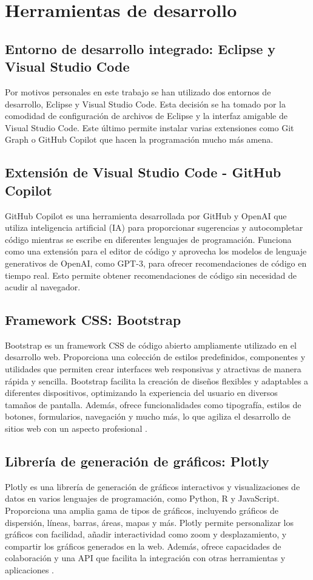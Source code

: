 \section{Herramientas de desarrollo}
\subsection{Entorno de desarrollo integrado: Eclipse y Visual Studio Code}
Por motivos personales en este trabajo se han utilizado dos entornos de desarrollo, Eclipse y Visual Studio Code. Esta decisión se ha tomado por la comodidad de configuración de archivos de Eclipse y la interfaz amigable de Visual Studio Code. Este último permite instalar varias extensiones como Git Graph o GitHub Copilot que hacen la programación mucho más amena.
\subsection{Extensión de Visual Studio Code - GitHub Copilot}
GitHub Copilot es una herramienta desarrollada por GitHub y OpenAI que utiliza inteligencia artificial (IA) para proporcionar sugerencias y autocompletar código mientras se escribe en diferentes lenguajes de programación. Funciona como una extensión para el editor de código y aprovecha los modelos de lenguaje generativos de OpenAI, como GPT-3, para ofrecer recomendaciones de código en tiempo real.
Esto permite obtener recomendaciones de código sin necesidad de acudir al navegador.
\subsection{Framework CSS: Bootstrap}
Bootstrap es un framework CSS de código abierto ampliamente utilizado en el desarrollo web. Proporciona una colección de estilos predefinidos, componentes y utilidades que permiten crear interfaces web responsivas y atractivas de manera rápida y sencilla. Bootstrap facilita la creación de diseños flexibles y adaptables a diferentes dispositivos, optimizando la experiencia del usuario en diversos tamaños de pantalla. Además, ofrece funcionalidades como tipografía, estilos de botones, formularios, navegación y mucho más, lo que agiliza el desarrollo de sitios web con un aspecto profesional \cite{bootstrap}.
\subsection{Librería de generación de gráficos: Plotly}
Plotly es una librería de generación de gráficos interactivos y visualizaciones de datos en varios lenguajes de programación, como Python, R y JavaScript. Proporciona una amplia gama de tipos de gráficos, incluyendo gráficos de dispersión, líneas, barras, áreas, mapas y más. Plotly permite personalizar los gráficos con facilidad, añadir interactividad como zoom y desplazamiento, y compartir los gráficos generados en la web. Además, ofrece capacidades de colaboración y una API que facilita la integración con otras herramientas y aplicaciones \cite{10.1111/rssa.12692}.

